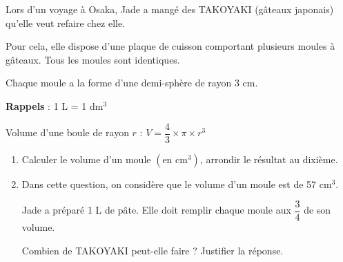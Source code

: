 
\medskip


Lors d'un voyage à Osaka, Jade a mangé des TAKOYAKI (gâteaux japonais)
qu'elle veut refaire chez elle. 

Pour cela, elle dispose d'une plaque de cuisson
comportant plusieurs moules à gâteaux. Tous les moules sont identiques.

Chaque moule a la forme d'une demi-sphère de rayon 3 cm.

\textbf{Rappels} : 1 L = 1 dm$^3$

\hspace{1.5cm}Volume d'une boule de rayon $r$ : $V = \dfrac{4}{3} \times \pi \times r^3$

\medskip

\begin{enumerate}
\item Calculer le volume d'un moule $\left(\text{en cm}^3\right)$, arrondir le résultat au dixième.
\item Dans cette question, on considère que le volume d'un moule est de 57 cm$^3$.

Jade a préparé 1 L de pâte. Elle doit remplir chaque moule aux $\dfrac{3}{4}$ de son volume.

Combien de TAKOYAKI peut-elle faire ? Justifier la réponse.
\end{enumerate}

\vspace{0,5cm}

